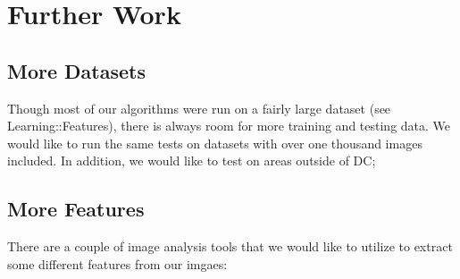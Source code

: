 \documentclass{article}
\begin{document}
\section{Further Work}

\subsection{More Datasets}
Though most of our algorithms were run on a fairly large dataset (see Learning::Features), there is always room for more training and testing data. We would like to run the same tests on datasets with over one thousand images included. In addition, we would like to test on areas outside of DC;


\subsection{More Features}
There are a couple of image analysis tools that we would like to utilize to extract some different features from our imgaes: 
\end{document}
